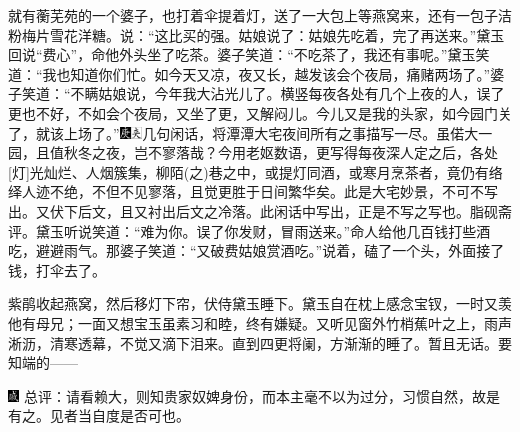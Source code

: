 就有蘅芜苑的一个婆子，也打着伞提着灯，送了一大包上等燕窝来，还有一包子洁粉梅片雪花洋糖。说：“这比买的强。姑娘说了：姑娘先吃着，完了再送来。”黛玉回说“费心”，命他外头坐了吃茶。婆子笑道：“不吃茶了，我还有事呢。”黛玉笑道：“我也知道你们忙。如今天又凉，夜又长，越发该会个夜局，痛赌两场了。”婆子笑道：“不瞒姑娘说，今年我大沾光儿了。横竖每夜各处有几个上夜的人，误了更也不好，不如会个夜局，又坐了更，又解闷儿。今儿又是我的头家，如今园门关了，就该上场了。”{\includegraphics[width=3mm]{../Images/00004}\includegraphics[width=3mm]{../Images/00012}\footnotesize \kaishu 几句闲话，将潭潭大宅夜间所有之事描写一尽。虽偌大一园，且值秋冬之夜，岂不寥落哉？今用老妪数语，更写得每夜深人定之后，各处{[}灯{]}光灿烂、人烟簇集，柳陌{(之)}巷之中，或提灯同酒，或寒月烹茶者，竟仍有络绎人迹不绝，不但不见寥落，且觉更胜于日间繁华矣。此是大宅妙景，不可不写出。又伏下后文，且又衬出后文之冷落。此闲话中写出，正是不写之写也。脂砚斋评。}黛玉听说笑道：“难为你。误了你发财，冒雨送来。”命人给他几百钱打些酒吃，避避雨气。那婆子笑道：“又破费姑娘赏酒吃。”说着，磕了一个头，外面接了钱，打伞去了。

紫鹃收起燕窝，然后移灯下帘，伏侍黛玉睡下。黛玉自在枕上感念宝钗，一时又羡他有母兄；一面又想宝玉虽素习和睦，终有嫌疑。又听见窗外竹梢蕉叶之上，雨声淅沥，清寒透幕，不觉又滴下泪来。直到四更将阑，方渐渐的睡了。暂且无话。要知端的------

{\includegraphics[width=3mm]{../Images/00005}  \kaishu 总评：请看赖大，则知贵家奴婢身份，而本主毫不以为过分，习惯自然，故是有之。见者当自度是否可也。}
